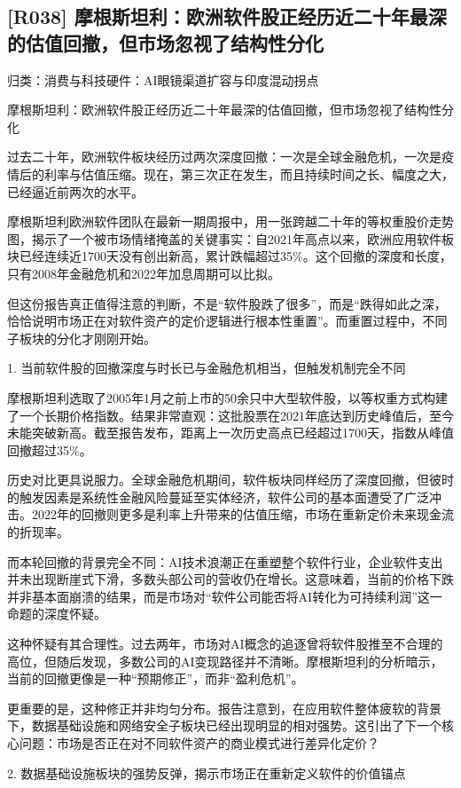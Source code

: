 \documentclass[11pt]{ctexart}
\begin{document}
\subsection{[R038] 摩根斯坦利：欧洲软件股正经历近二十年最深的估值回撤，但市场忽视了结构性分化}
{\small\color{refgray}归类：消费与科技硬件：AI眼镜渠道扩容与印度混动拐点}

摩根斯坦利：欧洲软件股正经历近二十年最深的估值回撤，但市场忽视了结构性分化

过去二十年，欧洲软件板块经历过两次深度回撤：一次是全球金融危机，一次是疫情后的利率与估值压缩。现在，第三次正在发生，而且持续时间之长、幅度之大，已经逼近前两次的水平。

摩根斯坦利欧洲软件团队在最新一期周报中，用一张跨越二十年的等权重股价走势图，揭示了一个被市场情绪掩盖的关键事实：自2021年高点以来，欧洲应用软件板块已经连续近1700天没有创出新高，累计跌幅超过35\%。这个回撤的深度和长度，只有2008年金融危机和2022年加息周期可以比拟。

但这份报告真正值得注意的判断，不是“软件股跌了很多”，而是“跌得如此之深，恰恰说明市场正在对软件资产的定价逻辑进行根本性重置”。而重置过程中，不同子板块的分化才刚刚开始。

1. 当前软件股的回撤深度与时长已与金融危机相当，但触发机制完全不同

摩根斯坦利选取了2005年1月之前上市的50余只中大型软件股，以等权重方式构建了一个长期价格指数。结果非常直观：这批股票在2021年底达到历史峰值后，至今未能突破新高。截至报告发布，距离上一次历史高点已经超过1700天，指数从峰值回撤超过35\%。

历史对比更具说服力。全球金融危机期间，软件板块同样经历了深度回撤，但彼时的触发因素是系统性金融风险蔓延至实体经济，软件公司的基本面遭受了广泛冲击。2022年的回撤则更多是利率上升带来的估值压缩，市场在重新定价未来现金流的折现率。

而本轮回撤的背景完全不同：AI技术浪潮正在重塑整个软件行业，企业软件支出并未出现断崖式下滑，多数头部公司的营收仍在增长。这意味着，当前的价格下跌并非基本面崩溃的结果，而是市场对“软件公司能否将AI转化为可持续利润”这一命题的深度怀疑。

这种怀疑有其合理性。过去两年，市场对AI概念的追逐曾将软件股推至不合理的高位，但随后发现，多数公司的AI变现路径并不清晰。摩根斯坦利的分析暗示，当前的回撤更像是一种“预期修正”，而非“盈利危机”。

更重要的是，这种修正并非均匀分布。报告注意到，在应用软件整体疲软的背景下，数据基础设施和网络安全子板块已经出现明显的相对强势。这引出了下一个核心问题：市场是否正在对不同软件资产的商业模式进行差异化定价？

2. 数据基础设施板块的强势反弹，揭示市场正在重新定义软件的价值锚点
\end{document}
